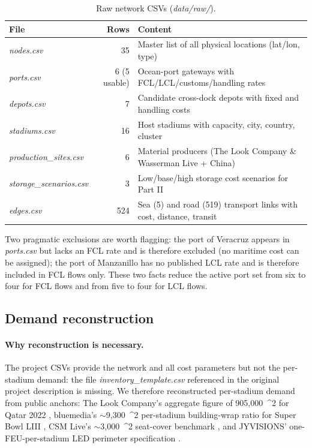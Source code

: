 \documentclass[11pt,a4paper]{article}
\numberwithin{equation}{section}
\newcommand{\msq}{\text{m}^{2}}
\newcommand{\filename}[1]{\textit{\small #1}}
\begin{document}
\begin{table}[h]
\centering
\small
\caption{Raw network CSVs (\filename{data/raw/}).}
\label{tab:network}
\begin{tabular}{@{}lrl@{}}
\toprule
\textbf{File} & \textbf{Rows} & \textbf{Content} \\
\midrule
\filename{nodes.csv} & 35 & Master list of all physical locations (lat/lon, type) \\
\filename{ports.csv} & 6 (5 usable) & Ocean-port gateways with FCL/LCL/customs/handling rates \\
\filename{depots.csv} & 7 & Candidate cross-dock depots with fixed and handling costs \\
\filename{stadiums.csv} & 16 & Host stadiums with capacity, city, country, cluster \\
\filename{production\_sites.csv} & 6 & Material producers (The Look Company \& Wasserman Live + China) \\
\filename{storage\_scenarios.csv} & 3 & Low/base/high storage cost scenarios for Part II \\
\filename{edges.csv} & 524 & Sea (5) and road (519) transport links with cost, distance, transit \\
\bottomrule
\end{tabular}
\end{table}

Two pragmatic exclusions are worth flagging: the port of Veracruz appears in \filename{ports.csv} but lacks an FCL rate and is therefore excluded (no maritime cost can be assigned); the port of Manzanillo has no published LCL rate and is therefore included in FCL flows only. These two facts reduce the active port set from six to four for FCL flows and from five to four for LCL flows.

\subsection{Demand reconstruction}\label{sec:data:demand}

\paragraph{Why reconstruction is necessary.} The project CSVs provide the network and all cost parameters but not the per-stadium demand: the file \filename{inventory\_template.csv} referenced in the original project description is missing. We therefore reconstructed per-stadium demand from public anchors: The Look Company's aggregate figure of 905{,}000~\msq{} for Qatar 2022 \cite{thelookcompany_qatar}, bluemedia's $\sim$9{,}300~\msq{} per-stadium building-wrap ratio for Super Bowl LIII \cite{bluemedia_superbowl}, CSM Live's $\sim$3{,}000~\msq{} seat-cover benchmark \cite{csmlive_dressing}, and JYVISIONS' one-FEU-per-stadium LED perimeter specification \cite{jyvisions_led}.
\end{document}
